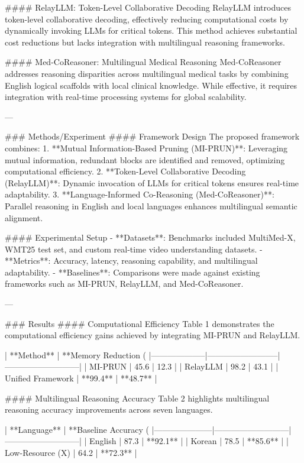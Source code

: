 #### RelayLLM: Token-Level Collaborative Decoding
RelayLLM introduces token-level collaborative decoding, effectively reducing computational costs by dynamically invoking LLMs for critical tokens. This method achieves substantial cost reductions but lacks integration with multilingual reasoning frameworks.

#### Med-CoReasoner: Multilingual Medical Reasoning
Med-CoReasoner addresses reasoning disparities across multilingual medical tasks by combining English logical scaffolds with local clinical knowledge. While effective, it requires integration with real-time processing systems for global scalability.

---

### Methods/Experiment
#### Framework Design
The proposed framework combines:
1. **Mutual Information-Based Pruning (MI-PRUN)**: Leveraging mutual information, redundant blocks are identified and removed, optimizing computational efficiency.
2. **Token-Level Collaborative Decoding (RelayLLM)**: Dynamic invocation of LLMs for critical tokens ensures real-time adaptability.
3. **Language-Informed Co-Reasoning (Med-CoReasoner)**: Parallel reasoning in English and local languages enhances multilingual semantic alignment.

#### Experimental Setup
- **Datasets**: Benchmarks included MultiMed-X, WMT25 test set, and custom real-time video understanding datasets.
- **Metrics**: Accuracy, latency, reasoning capability, and multilingual adaptability.
- **Baselines**: Comparisons were made against existing frameworks such as MI-PRUN, RelayLLM, and Med-CoReasoner.

---

### Results
#### Computational Efficiency
Table 1 demonstrates the computational efficiency gains achieved by integrating MI-PRUN and RelayLLM.

| **Method**        | **Memory Reduction (%
|--------------------|--------------------------|---------------------------|
| MI-PRUN           | 45.6                     | 12.3                      |
| RelayLLM          | 98.2                     | 43.1                      |
| Unified Framework | **99.4**                 | **48.7**                  |

#### Multilingual Reasoning Accuracy
Table 2 highlights multilingual reasoning accuracy improvements across seven languages.

| **Language**       | **Baseline Accuracy (%
|---------------------|---------------------------|---------------------------|
| English            | 87.3                      | **92.1**                  |
| Korean             | 78.5                      | **85.6**                  |
| Low-Resource (X)   | 64.2                      | **72.3**                  |

